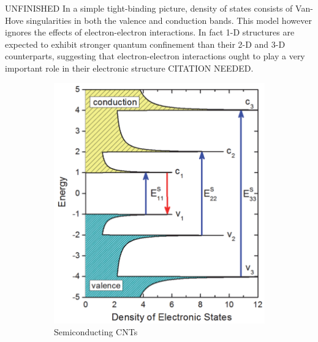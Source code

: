 {\color{red}UNFINISHED} In a simple tight-binding picture, density of states consists of Van-Hove singularities in both the valence and conduction bands. This model however ignores the effects of electron-electron interactions. In fact 1-D structures are expected to exhibit stronger quantum confinement than their 2-D and 3-D counterparts, suggesting that electron-electron interactions ought to play a very important role in their electronic structure {\color{red} CITATION NEEDED}. 

\begin{figure}
	\centering
	\begin{subfigure}[t]{0.4\textwidth}
		\centering
		\includegraphics[scale=0.37]{images/chapter_optical_props/dos_semic_weismanKono_book}
		\caption{Semiconducting CNTs}
	\end{subfigure}
	\qquad
	\begin{subfigure}[t]{0.4\textwidth}
		\centering

\end{subfigure}
\end{figure}
